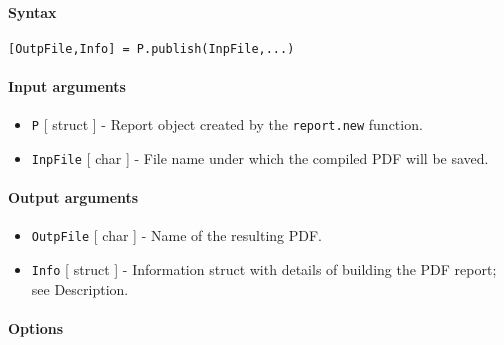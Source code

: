 


	\paragraph{Syntax}

\begin{verbatim}
[OutpFile,Info] = P.publish(InpFile,...)
\end{verbatim}

\paragraph{Input arguments}

\begin{itemize}
\item
  \texttt{P} {[} struct {]} - Report object created by the
  \texttt{report.new} function.
\item
  \texttt{InpFile} {[} char {]} - File name under which the compiled PDF
  will be saved.
\end{itemize}

\paragraph{Output arguments}

\begin{itemize}
\item
  \texttt{OutpFile} {[} char {]} - Name of the resulting PDF.
\item
  \texttt{Info} {[} struct {]} - Information struct with details of
  building the PDF report; see Description.
\end{itemize}

\paragraph{Options}

